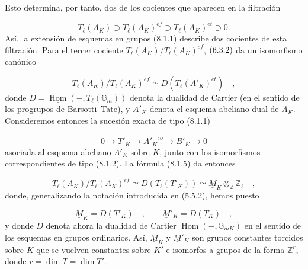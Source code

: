 Esto determina, por tanto, dos de los cocientes que aparecen en la
filtración

\begin{equation}\tag{8.1.4}
T_\ell(A_K) \supset T_\ell(A_K)^{ef}
 \supset T_\ell(A_K)^{et} \supset 0.
\end{equation}
Así, la extensión de esquemas en grupos (8.1.1) describe dos cocientes
de esta filtración. Para el tercer cociente
$T_\ell(A_K)/T_\ell(A_K)^{ef}$, $\sisi{(6.5.2)}{(6.3.2)}$ da un
isomorfismo canónico

\begin{equation}\tag{8.1.5}
T_\ell(A_K)/T_\ell(A_K)^{ef}
 \simeq D(T_\ell(A'_K)^{et}) \quad ,
\end{equation}
donde $D=\underline{\operatorname{Hom}}(-,T_\ell(\mathbb{G}_m))$
denota la dualidad de Cartier (en el sentido de los progrupos de
Barsotti--Tate), y $A'_K$ denota el esquema abeliano dual de $A_K$.
Consideremos entonces la sucesión exacta de tipo (8.1.1)

\begin{equation}\tag{8.1.6}
0 \longrightarrow T'_K \longrightarrow {A'_K}^{\natural o}
 \longrightarrow B'_K \longrightarrow 0
\end{equation}
asociada al esquema abeliano $A'_K$ sobre $K$, junto con los
isomorfismos correspondientes de tipo (8.1.2). La fórmula (8.1.5) da
entonces

\begin{equation}\tag{8.1.7}
T_\ell(A_K)/T_\ell(A_K)^{ef}
 \simeq D(T_\ell(T'_K))
 \simeq \underline{M}_K\otimes_{\mathbb{Z}}\mathbb{Z}_\ell \quad ,
\end{equation}
donde, generalizando la notación introducida en (5.5.2), hemos puesto

\begin{equation}\tag{8.1.8}
\underline{M}_K=D(T'_K) \quad , \qquad
\underline{M}'_K=D(T_K) \quad ,
\end{equation}
y donde $D$ denota ahora la dualidad de Cartier
$\underline{\operatorname{Hom}}(-,\mathbb{G}_{mK})$ en el sentido de
los esquemas en grupos ordinarios. Así, $\underline{M}_K$ y
$\underline{M}'_K$ son grupos constantes torcidos sobre $K$ que se
vuelven constantes sobre $K'$ e isomorfos a grupos de la forma
$\mathbb{Z}^{r}$, donde $r=\dim T=\dim T'$.
